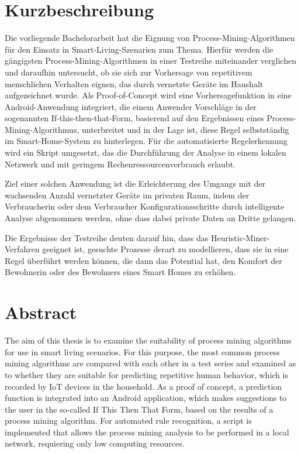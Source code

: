 \chapter*{Kurzbeschreibung}\vspace{17mm}
Die vorliegende Bachelorarbeit hat die Eignung von Process-Mining-Algorithmen für den Einsatz in Smart-Living-Szenarien zum Thema. Hierfür werden die gängigsten Process-Mining-Algorithmen in einer Testreihe miteinander verglichen und daraufhin untersucht, ob sie sich zur Vorhersage von repetitivem menschlichen Verhalten eignen, das durch vernetzte Geräte im Haushalt aufgezeichnet wurde. Als Proof-of-Concept wird eine Vorhersagefunktion in eine Android-Anwendung integriert, die einem Anwender Vorschläge in der sogenannten If-this-then-that-Form, basierend auf den Ergebnissen eines Process-Mining-Algorithmus, unterbreitet und in der Lage ist, diese Regel selbstständig im Smart-Home-System zu hinterlegen. Für die automatisierte Regelerkennung wird ein Skript umgesetzt, das die Durchführung der Analyse in einem lokalen Netzwerk und mit geringem Rechenressourcenverbrauch erlaubt.

Ziel einer solchen Anwendung ist die Erleichterung des Umgangs mit der wachsenden Anzahl vernetzter Geräte im privaten Raum, indem der Verbraucherin oder dem Verbraucher Konfigurationsschritte durch intelligente Analyse abgenommen werden, ohne dass dabei private Daten an Dritte gelangen.

Die Ergebnisse der Testreihe deuten darauf hin, dass das Heuristic-Miner-Verfahren geeignet ist, gesuchte Prozesse derart zu modellieren, dass sie in eine Regel überführt werden können, die dann das Potential hat, den Komfort der Bewohnerin oder des Bewohners eines Smart Homes zu erhöhen.

\newpage
\chapter*{Abstract}\vspace{17mm}
The aim of this thesis is to examine the suitability of process mining algorithms for use in smart living scenarios. For this purpose, the most common process mining algorithms are compared with each other in a test series and examined as to whether they are suitable for predicting repetitive human behavior, which is  recorded by IoT devices in the household. As a proof of concept, a prediction function is integrated into an Android application, which makes suggestions to the user in the so-called If This Then That Form, based on the results of a process mining algorithm. 
For automated rule recognition, a script is implemented that allows the process mining analysis to be performed in a local network, requiering only low computing resources. 

